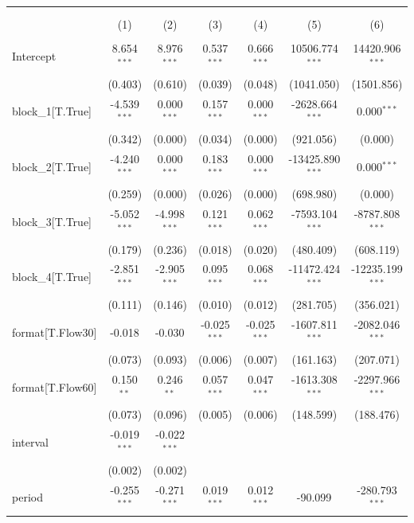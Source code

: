 \begin{table}[!htbp] \centering
\begin{tabular}{@{\extracolsep{5pt}}lcccccc}
\\[-1.8ex]\hline
\hline \\[-1.8ex]
\\[-1.8ex] & (1) & (2) & (3) & (4) & (5) & (6) \\
\hline \\[-1.8ex]
 Intercept & 8.654$^{***}$ & 8.976$^{***}$ & 0.537$^{***}$ & 0.666$^{***}$ & 10506.774$^{***}$ & 14420.906$^{***}$ \\
& (0.403) & (0.610) & (0.039) & (0.048) & (1041.050) & (1501.856) \\
 block_1[T.True] & -4.539$^{***}$ & 0.000$^{***}$ & 0.157$^{***}$ & 0.000$^{***}$ & -2628.664$^{***}$ & 0.000$^{***}$ \\
& (0.342) & (0.000) & (0.034) & (0.000) & (921.056) & (0.000) \\
 block_2[T.True] & -4.240$^{***}$ & 0.000$^{***}$ & 0.183$^{***}$ & 0.000$^{***}$ & -13425.890$^{***}$ & 0.000$^{***}$ \\
& (0.259) & (0.000) & (0.026) & (0.000) & (698.980) & (0.000) \\
 block_3[T.True] & -5.052$^{***}$ & -4.998$^{***}$ & 0.121$^{***}$ & 0.062$^{***}$ & -7593.104$^{***}$ & -8787.808$^{***}$ \\
& (0.179) & (0.236) & (0.018) & (0.020) & (480.409) & (608.119) \\
 block_4[T.True] & -2.851$^{***}$ & -2.905$^{***}$ & 0.095$^{***}$ & 0.068$^{***}$ & -11472.424$^{***}$ & -12235.199$^{***}$ \\
& (0.111) & (0.146) & (0.010) & (0.012) & (281.705) & (356.021) \\
 format[T.Flow30] & -0.018$^{}$ & -0.030$^{}$ & -0.025$^{***}$ & -0.025$^{***}$ & -1607.811$^{***}$ & -2082.046$^{***}$ \\
& (0.073) & (0.093) & (0.006) & (0.007) & (161.163) & (207.071) \\
 format[T.Flow60] & 0.150$^{**}$ & 0.246$^{**}$ & 0.057$^{***}$ & 0.047$^{***}$ & -1613.308$^{***}$ & -2297.966$^{***}$ \\
& (0.073) & (0.096) & (0.005) & (0.006) & (148.599) & (188.476) \\
 interval & -0.019$^{***}$ & -0.022$^{***}$ & & & & \\
& (0.002) & (0.002) & & & & \\
 period & -0.255$^{***}$ & -0.271$^{***}$ & 0.019$^{***}$ & 0.012$^{***}$ & -90.099$^{}$ & -280.793$^{***}$ \\

\end{tabular}
\end{table}
